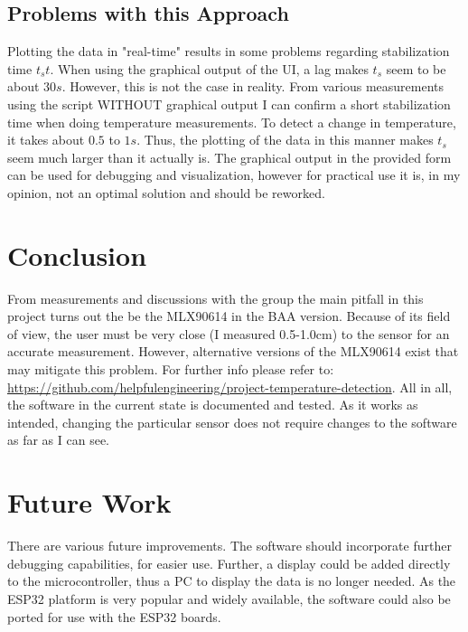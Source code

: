 \documentclass{article}[12pt]
\begin{document}
\subsection*{Problems with this Approach}

Plotting the data in "real-time" results in some problems regarding stabilization time $t_st$. When using the graphical output of the UI, a lag makes $t_s$ seem to be about $30s$. However, this is not the case in reality. From various measurements using the script WITHOUT graphical output I can confirm a short stabilization time when doing temperature measurements. To detect a change in temperature, it takes about $0.5$ to $1s$. Thus, the plotting of the data in this manner makes $t_s$ seem much larger than it actually is. The graphical output in the provided form can be used for debugging and visualization, however for practical use it is, in my opinion, not an optimal solution and should be reworked. 

\section{Conclusion}

From measurements and discussions with the group the main pitfall in this project turns out the be the MLX90614 in the BAA version. Because of its field of view, the user must be very close (I measured 0.5-1.0cm) to the sensor for an accurate measurement. However, alternative versions of the MLX90614 exist that may mitigate this problem. For further info please refer to: \url{https://github.com/helpfulengineering/project-temperature-detection}. All in all, the software in the current state is documented and tested. As it works as intended, changing the particular sensor does not require changes to the software as far as I can see. 

\section{Future Work}

There are various future improvements. The software should incorporate further debugging capabilities, for easier use. Further, a display could be added directly to the microcontroller, thus a PC to display the data is no longer needed. As the ESP32 platform is very popular and widely available, the software could also be ported for use with the ESP32 boards. 
\end{document}
